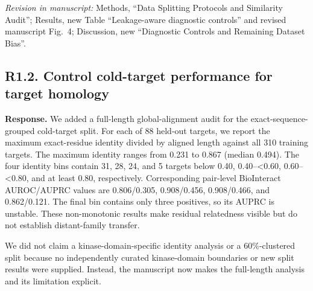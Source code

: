 \documentclass[11pt,a4paper]{article}
\newcommand{\response}{\noindent\textbf{Response.} }
\newcommand{\change}[1]{\par\smallskip\noindent\textit{Revision in manuscript:} #1\par\medskip}
\begin{document}
\change{Methods, ``Data Splitting Protocols and Similarity Audit''; Results,
new Table ``Leakage-aware diagnostic controls'' and revised manuscript Fig.~4;
Discussion, new ``Diagnostic Controls and Remaining Dataset Bias''.}

\subsection*{R1.2. Control cold-target performance for target homology}


\response We added a full-length global-alignment audit for the
exact-sequence-grouped cold-target split.  For each of 88 held-out targets, we
report the maximum exact-residue identity divided by aligned length against all
310 training targets.  The maximum identity ranges from 0.231 to 0.867 (median
0.494).  The four identity bins contain 31, 28, 24, and 5 targets below 0.40,
0.40--<0.60, 0.60--<0.80, and at least 0.80, respectively.  Corresponding
pair-level BioInteract AUROC/AUPRC values are 0.806/0.305, 0.908/0.456,
0.908/0.466, and 0.862/0.121.  The final bin contains only three positives, so
its AUPRC is unstable.  These non-monotonic results make residual relatedness
visible but do not establish distant-family transfer.

We did not claim a kinase-domain-specific identity analysis or a 60\%-clustered
split because no independently curated kinase-domain boundaries or new split
results were supplied.  Instead, the manuscript now makes the full-length
analysis and its limitation explicit.
\end{document}
